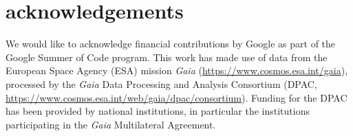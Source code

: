\section{acknowledgements}

We would like to acknowledge financial contributions by Google as part of the Google Summer of Code program.
This work has made use of data from the European Space Agency (ESA) mission {\it Gaia} (\url{https://www.cosmos.esa.int/gaia}), processed by the {\it Gaia} Data Processing and Analysis Consortium (DPAC, \url{https://www.cosmos.esa.int/web/gaia/dpac/consortium}).
Funding for the DPAC has been provided by national institutions, in particular the institutions participating in the {\it Gaia} Multilateral Agreement.
